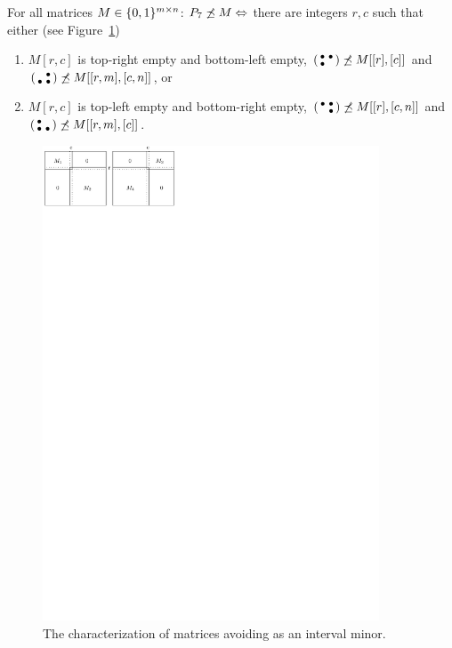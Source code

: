 \begin{prop}
\label{prop:p33}
For all matrices $M\in\{0,1\}^{m\times n}$: $P_7\not\preceq M\Leftrightarrow$ there are integers $r,c$ such that either (see Figure~\ref{fig:p33})
\begin{enumerate}
	\item $M[r,c]$ is top-right empty and bottom-left empty, $\left(\begin{smallmatrix}\bullet&\bullet\\\bullet& \end{smallmatrix}\right)\not\preceq M[[r],[c]]$ and $\left(\begin{smallmatrix} &\bullet\\\bullet&\bullet\end{smallmatrix}\right)\not\preceq M[[r,m],[c,n]]$, or
	\item $M[r,c]$ is top-left empty and bottom-right empty, $\left(\begin{smallmatrix}\bullet&\bullet\\ &\bullet\end{smallmatrix}\right)\not\preceq M[[r],[c,n]]$ and $\left(\begin{smallmatrix}\bullet& \\\bullet&\bullet\end{smallmatrix}\right)\not\preceq M[[r,m],[c]]$.
\end{enumerate}
\end{prop}
\begin{figure}[!ht]
\centering
\includegraphics[width=100mm]{img/p33.pdf}
\caption{The characterization of matrices avoiding \usebox{\smlmatb} as an interval minor.}
\label{fig:p33}
\end{figure}
